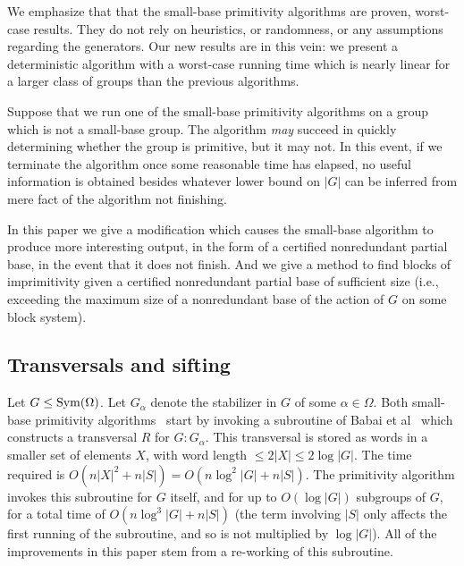 \documentclass[12pt]{article}
\newcommand{\Sym}{{\rm Sym}}
\begin{document}
We emphasize that that the small-base primitivity algorithms
\cite{Beals1991,SchonertSeress1994}
are proven, worst-case results.
They do not rely on heuristics, or randomness,
or any assumptions regarding the generators.
Our new results are in this vein: we present
a deterministic algorithm with a worst-case
running time which is nearly linear for a larger
class of groups than the previous algorithms.

Suppose that we run one of the small-base primitivity algorithms
on a group which is not a small-base group.
The algorithm {\em may}\/ succeed in quickly determining whether
the group is primitive, but it may not.
In this event,
if we terminate the algorithm once some reasonable time has elapsed,
no useful information is obtained besides whatever lower
bound on $|G|$ can be inferred from mere fact of the algorithm not finishing.


In this paper we give a modification which causes the small-base
algorithm to produce more interesting output, in the form
of a certified nonredundant partial base, in the event that
it does not finish.  And we give a method to find blocks of imprimitivity
given a certified nonredundant partial base of sufficient size (i.e., exceeding
the maximum size of a nonredundant base of the action of $G$ on
some block system).



\subsection{Transversals and sifting}
Let $G\leq\Sym(\Omega)$.  Let
$G_\alpha$ denote the stabilizer in $G$ of some $\alpha\in\Omega$.
Both small-base primitivity algorithms~\cite{Beals1991,SchonertSeress1994}
start by invoking a subroutine of Babai et al~\cite{babai1991nearly}
which  constructs a transversal
$R$ for $G:G_\alpha$.
This transversal is stored as words in a smaller set of
elements $X$, with word length $\leq 2|X|\leq 2\log|G|$.
The time required is $O(n|X|^2+n|S|)=O(n\log^2|G|+n|S|)$.
The primitivity algorithm invokes this subroutine for $G$ itself, and for
up to $O(\log|G|)$ subgroups of $G$, for a total time of
$O(n\log^3|G|+n|S|)$ (the term involving $|S|$ only
affects the first running of the subroutine, and so is not multiplied by
$\log|G|$).
All of the improvements in this paper
stem from a re-working of this subroutine.
\end{document}
